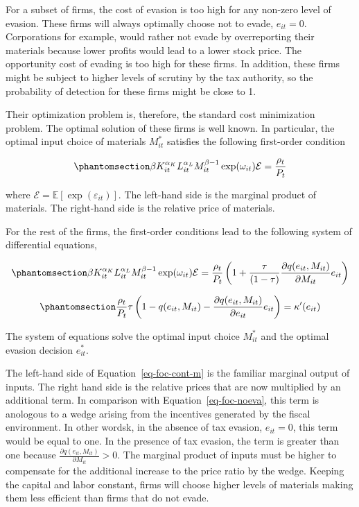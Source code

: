 \documentclass[
  12pt]{article}
\theoremstyle{definition}
\theoremstyle{remark}
\begin{document}
For a subset of firms, the cost of evasion is too high for any non-zero
level of evasion. These firms will always optimally choose not to evade,
\(e_{it}=0\). Corporations for example, would rather not evade by
overreporting their materials because lower profits would lead to a
lower stock price. The opportunity cost of evading is too high for these
firms. In addition, these firms might be subject to higher levels of
scrutiny by the tax authority, so the probability of detection for these
firms might be close to 1.

Their optimization problem is, therefore, the standard cost minimization
problem. The optimal solution of these firms is well known. In
particular, the optimal input choice of materials \(M^*_{it}\) satisfies
the following first-order condition

\begin{equation}\phantomsection\label{eq-foc-noeva}{
\beta K_{it}^{\alpha_K}L_{it}^{\alpha_L}M_{it}^{\beta-1}\exp(\omega_{it})\mathcal{E}=\frac{\rho_{t}}{P_t}
}\end{equation}

where \(\mathcal{E}=\mathbb{E}[\exp(\varepsilon_{it})]\). The left-hand
side is the marginal product of materials. The right-hand side is the
relative price of materials.

For the rest of the firms, the first-order conditions lead to the
following system of differential equations,

\begin{equation}\phantomsection\label{eq-foc-cont-m}{
\beta K_{it}^{\alpha_K}L_{it}^{\alpha_L}M_{it}^{\beta-1}\exp(\omega_{it})\mathcal{E}=\frac{\rho_{t}}{P_t}\left(1+\frac{\tau}{(1-\tau)}\frac{\partial q(e_{it},M_{it})}{\partial M_{it}}e_{it}\right)
}\end{equation}

\begin{equation}\phantomsection\label{eq-foc-cont-e}{
\frac{\rho_t}{P_t}\tau\left(1-q(e_{it}, M_{it})-\frac{\partial q(e_{it}, M_{it})}{\partial e_{it}} e_{it}\right) =\kappa'(e_{it})
}\end{equation}

The system of equations solve the optimal input choice \(M^*_{it}\) and
the optimal evasion decision \(e^*_{it}\).

The left-hand side of Equation~\ref{eq-foc-cont-m} is the familiar
marginal output of inputs. The right hand side is the relative prices
that are now multiplied by an additional term. In comparison with
Equation~\ref{eq-foc-noeva}, this term is anologous to a wedge arising
from the incentives generated by the fiscal environment. In other
wordsk, in the absence of tax evasion, \(e_{it}=0\), this term would be
equal to one. In the presence of tax evasion, the term is greater than
one because \(\frac{\partial q(e_{it},M_{it})}{\partial M_{it}}>0\). The
marginal product of inputs must be higher to compensate for the
additional increase to the price ratio by the wedge. Keeping the capital
and labor constant, firms will choose higher levels of materials making
them less efficient than firms that do not evade.
\end{document}
